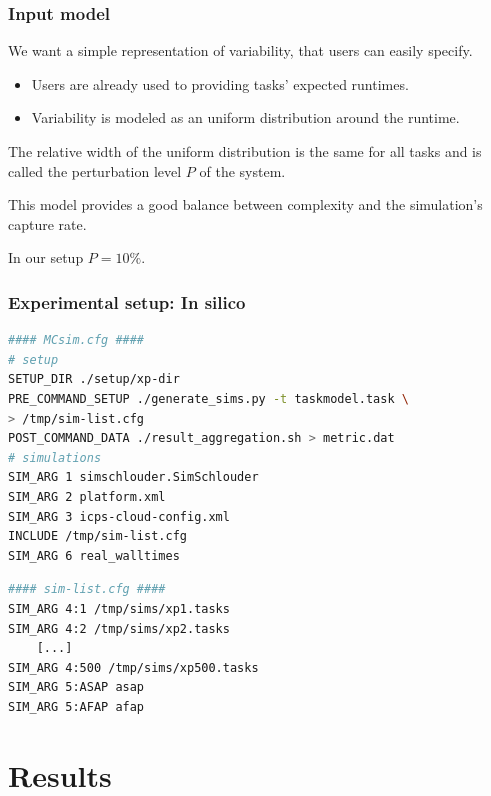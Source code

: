 \documentclass{beamer}
\begin{document}
\begin{frame}
	\frametitle{Input model}
	We want a simple representation of variability, that users can
	easily specify.
	\begin{itemize}
		\item Users are already used to providing tasks' expected
			runtimes.
		\item Variability is modeled as an uniform distribution around
			the runtime.
	\end{itemize}
	\bigskip
	\pause
	The relative width of the uniform distribution is the same for all tasks
	and is called the \alert{perturbation level} $P$ of the system.
	\begin{block}{}
		This model provides a good balance between complexity and the
		simulation's capture rate. 
	\end{block}
	\pause
	\begin{center}
	In our setup $P = 10\%$.
\end{center}
\end{frame}

\begin{frame}[fragile]
	\frametitle{Experimental setup: In silico}
\begin{lstlisting}[language=bash,basicstyle=\tt\footnotesize,backgroundcolor=\color{gray!10},
morekeywords={SETUP_DIR,TU_ARG,PRE_COMMAND_SETUP,POST_COMMAND_DATA,SIM_ARG,INCLUDE},
keywordstyle=\color{red!90},commentstyle=\color{blue!70}]
#### MCsim.cfg ####
# setup
SETUP_DIR ./setup/xp-dir
PRE_COMMAND_SETUP ./generate_sims.py -t taskmodel.task \
> /tmp/sim-list.cfg
POST_COMMAND_DATA ./result_aggregation.sh > metric.dat
# simulations
SIM_ARG 1 simschlouder.SimSchlouder
SIM_ARG 2 platform.xml 
SIM_ARG 3 icps-cloud-config.xml
INCLUDE /tmp/sim-list.cfg
SIM_ARG 6 real_walltimes
\end{lstlisting}
\begin{lstlisting}[language=bash,basicstyle=\tt\footnotesize,backgroundcolor=\color{gray!10},
morekeywords={SETUP_DIR,TU_ARG,PRE_COMMAND_SETUP,POST_COMMAND_DATA,SIM_ARG,INCLUDE},
keywordstyle=\color{red!90},commentstyle=\color{blue!70}]
#### sim-list.cfg ####
SIM_ARG 4:1 /tmp/sims/xp1.tasks
SIM_ARG 4:2 /tmp/sims/xp2.tasks
	[...]
SIM_ARG 4:500 /tmp/sims/xp500.tasks
SIM_ARG 5:ASAP asap
SIM_ARG 5:AFAP afap
\end{lstlisting}
\end{frame}


\section{Results}
\end{document}
